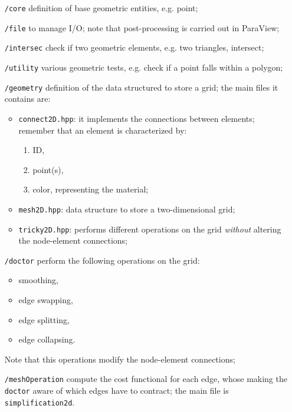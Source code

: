 \documentclass[11pt,a4paper]{article}
\theoremstyle{definition}
\theoremstyle{theorem}
\numberwithin{equation}{section}
\numberwithin{figure}{section}
\begin{document}
		\begin{itemize}
			\item[\texttt{/core}] definition of base geometric entities, e.g. point;
			\item[\texttt{/file}] to manage I/O; note that post-processing is carried out in ParaView;
			\item[\texttt{/intersec}] check if two geometric elements, e.g. two triangles, intersect;
			\item[\texttt{/utility}] various geometric tests, e.g. check if a point falls within a polygon;
			\item[\texttt{/geometry}] definition of the data structured to store a grid; the main files it contains are:
			\begin{itemize}
				\item \texttt{connect2D.hpp}: it implements the connections between elements; remember that an element is characterized by:
				\begin{enumerate}
					\item ID,
					\item point(s),
					\item color, representing the material;
				\end{enumerate}
				\item \texttt{mesh2D.hpp}: data structure to store a two-dimensional grid;
				\item \texttt{tricky2D.hpp}: performs different operations on the grid \emph{without} altering the node-element connections;
			\end{itemize}
			\item[\texttt{/doctor}] perform the following operations on the grid:
			\begin{itemize}
				\item smoothing,
				\item edge swapping,
				\item edge splitting,
				\item edge collapsing.
			\end{itemize} 
			Note that this operations modify the node-element connections;
			\item[\texttt{/meshOperation}] compute the cost functional for each edge, whose making the \texttt{doctor} aware of which edges have to contract; the main file is \texttt{simplification2d}.
		\end{itemize}
\end{document}

